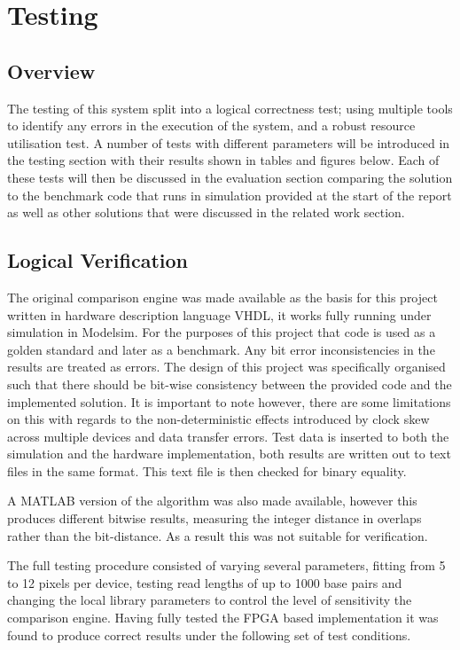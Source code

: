 \chapter{Testing}
\renewcommand{\baselinestretch}{\mystretch}
\label{chap:Testing}
\section{Overview}
The testing of this system split into a logical correctness test; using multiple tools to identify any errors in the execution of the system, and a robust resource utilisation test. A number of tests with different parameters will be introduced in the testing section with their results shown in tables and figures below. Each of these tests will then be discussed in the evaluation section comparing the solution to the benchmark code that runs in simulation provided at the start of the report as well as other solutions that were discussed in the related work section. 

\section{Logical Verification}
The original comparison engine was made available as the basis for this project written in hardware description language VHDL, it works fully running under simulation in Modelsim. For the purposes of this project that code is used as a golden standard and later as a benchmark. Any bit error inconsistencies in the results are treated as errors. The design of this project was specifically organised such that there should be bit-wise consistency between the provided code and the implemented solution. It is important to note however, there are some limitations on this with regards to the non-deterministic effects introduced by clock skew across multiple devices and data transfer errors. Test data is inserted to both the simulation and the hardware implementation, both results are written out to text files in the same format. This text file is then checked for binary equality. 


A MATLAB version of the algorithm was also made available, however this produces different bitwise results, measuring the integer distance in overlaps rather than the bit-distance. As a result this was not suitable for verification. 


The full testing procedure consisted of varying several parameters, fitting from 5 to 12 pixels per device, testing read lengths of up to 1000 base pairs and changing the local library parameters to control the level of sensitivity the comparison engine. Having fully tested the FPGA based implementation it was found to produce correct results under the following set of test conditions. 


